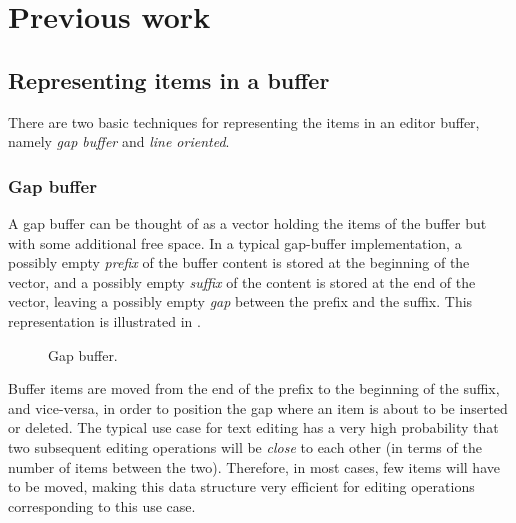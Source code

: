 \section{Previous work}
\label{sec-previous-work}

\subsection{Representing items in a buffer}

There are two basic techniques for representing the items in an editor
buffer, namely \emph{gap buffer} and \emph{line oriented}.

\subsubsection{Gap buffer}
\label{sec-previous-gap-buffer}

A gap buffer can be thought of as a vector holding the items of the
buffer but with some additional free space.  In a typical gap-buffer
implementation, a possibly empty \emph{prefix} of the buffer content
is stored at the beginning of the vector, and a possibly empty
\emph{suffix} of the content is stored at the end of the vector,
leaving a possibly empty \emph{gap} between the prefix and the suffix.
This representation is illustrated in .

\begin{figure}
\begin{center}
\end{center}
\caption{\label{fig-gap-buffer}
Gap buffer.}
\end{figure}

Buffer items are moved from the end of the prefix to the beginning of
the suffix, and vice-versa, in order to position the gap where an item
is about to be inserted or deleted.  The typical use case for text
editing has a very high probability that two subsequent editing
operations will be \emph{close} to each other (in terms of the number
of items between the two).  Therefore, in most cases, few
items will have to be moved, making this data structure very
efficient for editing operations corresponding to this use case.


